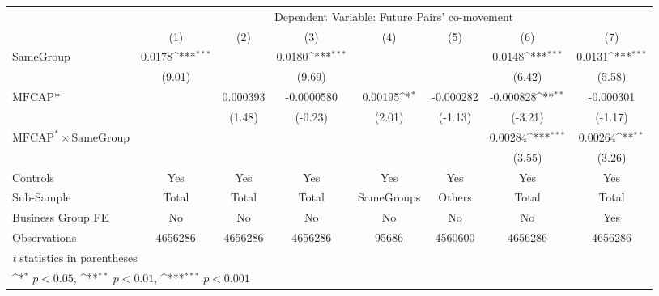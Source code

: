 {
\def\sym#1{\ifmmode^{#1}\else\(^{#1}\)\fi}
\begin{tabular}{l*{7}{c}}
\hline\hline
                &\multicolumn{7}{c}{Dependent Variable: Future Pairs' co-movement}                                                                   \\\cmidrule(lr){2-8}
                &\multicolumn{1}{c}{(1)}         &\multicolumn{1}{c}{(2)}         &\multicolumn{1}{c}{(3)}         &\multicolumn{1}{c}{(4)}         &\multicolumn{1}{c}{(5)}         &\multicolumn{1}{c}{(6)}         &\multicolumn{1}{c}{(7)}         \\
\hline
SameGroup       &   0.0178\sym{***}&                  &   0.0180\sym{***}&                  &                  &   0.0148\sym{***}&   0.0131\sym{***}\\
                &   (9.01)         &                  &   (9.69)         &                  &                  &   (6.42)         &   (5.58)         \\
[1em]
$ \text{MFCAP*} $&                  & 0.000393         &-0.0000580         &  0.00195\sym{*}  &-0.000282         &-0.000828\sym{**} &-0.000301         \\
                &                  &   (1.48)         &  (-0.23)         &   (2.01)         &  (-1.13)         &  (-3.21)         &  (-1.17)         \\
[1em]
 $ \text{MFCAP}^* \times {\text{SameGroup} }  $ &                  &                  &                  &                  &                  &  0.00284\sym{***}&  0.00264\sym{**} \\
                &                  &                  &                  &                  &                  &   (3.55)         &   (3.26)         \\
\hline
Controls        &      Yes         &      Yes         &      Yes         &      Yes         &      Yes         &      Yes         &      Yes         \\
Sub-Sample      &    Total         &    Total         &    Total         &SameGroups         &   Others         &    Total         &    Total         \\
Business Group FE&       No         &       No         &       No         &       No         &       No         &       No         &      Yes         \\
Observations    &  4656286         &  4656286         &  4656286         &    95686         &  4560600         &  4656286         &  4656286         \\
\hline\hline
\multicolumn{8}{l}{\footnotesize \textit{t} statistics in parentheses}\\
\multicolumn{8}{l}{\footnotesize \sym{*} \(p<0.05\), \sym{**} \(p<0.01\), \sym{***} \(p<0.001\)}\\
\end{tabular}
}
